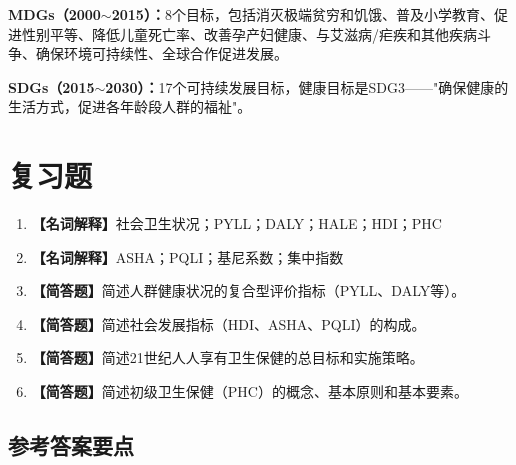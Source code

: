 \begin{defbox}
\textbf{MDGs（2000$\sim$2015）：}8个目标，包括消灭极端贫穷和饥饿、普及小学教育、促进性别平等、降低儿童死亡率、改善孕产妇健康、与艾滋病/疟疾和其他疾病斗争、确保环境可持续性、全球合作促进发展。

\textbf{SDGs（2015$\sim$2030）：}17个可持续发展目标，健康目标是SDG3——"确保健康的生活方式，促进各年龄段人群的福祉"。
\end{defbox}

\section{复习题}

\begin{enumerate}[leftmargin=*, itemsep=8pt]
    \item \textbf{【名词解释】}社会卫生状况；PYLL；DALY；HALE；HDI；PHC
    \item \textbf{【名词解释】}ASHA；PQLI；基尼系数；集中指数
    \item \textbf{【简答题】}简述人群健康状况的复合型评价指标（PYLL、DALY等）。
    \item \textbf{【简答题】}简述社会发展指标（HDI、ASHA、PQLI）的构成。
    \item \textbf{【简答题】}简述21世纪人人享有卫生保健的总目标和实施策略。
    \item \textbf{【简答题】}简述初级卫生保健（PHC）的概念、基本原则和基本要素。
\end{enumerate}

\subsection*{参考答案要点}

